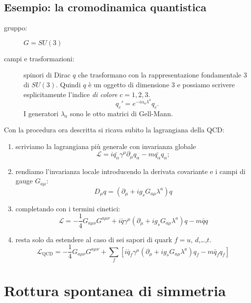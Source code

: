\documentclass[italian,a4paper]{article}
\theoremstyle{definition}
\newcommand{\lagr}{\ensuremath{\mathscr{L}}}
\newcommand{\dimu}{\ensuremath{\partial_{\mu}}}
\newcommand{\Dimu}{\ensuremath{D_{\mu}}}
\begin{document}
\subsection{Esempio: la cromodinamica quantistica}
\begin{description}
    \item[gruppo:] $G = SU(3)$
    \item[campi e trasformazioni:] spinori di Dirac $q$ che trasformano con la
        rappresentazione fondamentale $3$ di $SU(3)$. Quindi $q$ \`e un
        oggetto di dimensione $3$ e possiamo scrivere esplicitamente
        l'indice \emph{di colore} $c = 1, 2, 3$. 
        \begin{equation*}
            q_c' = e^{-i \alpha_a \lambda^a}q_c.
        \end{equation*} I generatori $\lambda_a$ sono le otto matrici di
        Gell-Mann.
\end{description}
Con la procedura ora descritta si ricava subito la lagrangiana della QCD:
\begin{enumerate}
    \item scriviamo la lagrangiana pi\`u generale con invarianza globale
        \begin{equation*}
            \lagr = i \bar{q_\alpha}\gamma^\mu\dimu q_\alpha - m
            \bar{q_\alpha}q_\alpha;
        \end{equation*}
    \item rendiamo l'invarianza locale introducendo la derivata covariante e
        i campi di gauge $G_{a\mu}$:
        \begin{equation*}
            \Dimu q = (\dimu + i g_s G_{a\mu}\lambda^a)q
        \end{equation*}
\item completando con i termini cinetici:
    \begin{equation*}
        \lagr = - \dfrac{1}{4}G_{a\mu\nu}G^{a\mu\nu} + i \bar q
        \gamma^\mu(\dimu + i g_s G_{a\mu}\lambda^a)q - m \bar q q
    \end{equation*}
\item resta solo da estendere al caso di sei sapori di quark $f = u$,
    $d$,\dots,$t$.
    \begin{equation*}
        \lagr_{\text{QCD}} = - \dfrac{1}{4}G_{a\mu\nu}G^{a\mu\nu} + \sum_f[i
        \bar q_f
        \gamma^\mu(\dimu + i g_s G_{a\mu}\lambda^a)q_f - m \bar q_f q_f]         
    \end{equation*}
\end{enumerate}
\section{Rottura spontanea di simmetria}
\end{document}
